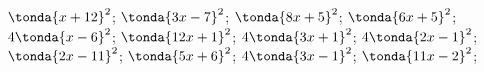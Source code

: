 \begin{esercizio}
\begin{htmulticols}{3}
\begin{enumeratea}
\end{enumeratea}
\end{htmulticols}
\noindent\! \(\tonda{x + 12}^{2}\); \quad 
{} \(\tonda{3 x - 7}^{2}\); \quad 
{} \(\tonda{8 x + 5}^{2}\); \quad 
{} \(\tonda{6 x + 5}^{2}\); \quad \\
 \(4 \tonda{x - 6}^{2}\); \quad 
{} \(\tonda{12 x + 1}^{2}\); \quad 
{} \(4 \tonda{3 x + 1}^{2}\); \quad 
{} \(4 \tonda{2 x - 1}^{2}\); \quad \\
 \(\tonda{2 x - 11}^{2}\); \quad 
{} \(\tonda{5 x + 6}^{2}\); \quad 
{} \(4 \tonda{3 x - 1}^{2}\); \quad 
{} \(\tonda{11 x - 2}^{2}\); \quad \\

\end{esercizio}
